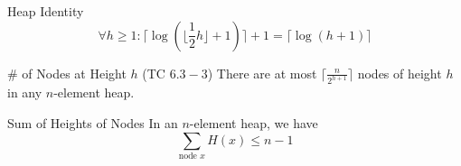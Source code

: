 
\begin{frame}{}
  \begin{exampleblock}{Heap Identity}
    \[
      \forall h \ge 1: \lceil \log(\lfloor \frac{1}{2}h \rfloor + 1)\rceil + 1 = \lceil \log (h+1) \rceil
    \]
  \end{exampleblock}
\end{frame}

\begin{frame}{}
  \begin{exampleblock}{\# of Nodes at Height $h$ (TC $6.3-3$)}
    There are at most $\lceil \frac{n}{2^{h+1}} \rceil$ nodes of height $h$ in any $n$-element heap.
  \end{exampleblock}
\end{frame}

\begin{frame}{}
  \begin{exampleblock}{Sum of Heights of Nodes}
    In an $n$-element heap, we have
    \[
      \sum_{\text{node } x} H(x) \le n-1
    \]
  \end{exampleblock}
\end{frame}
